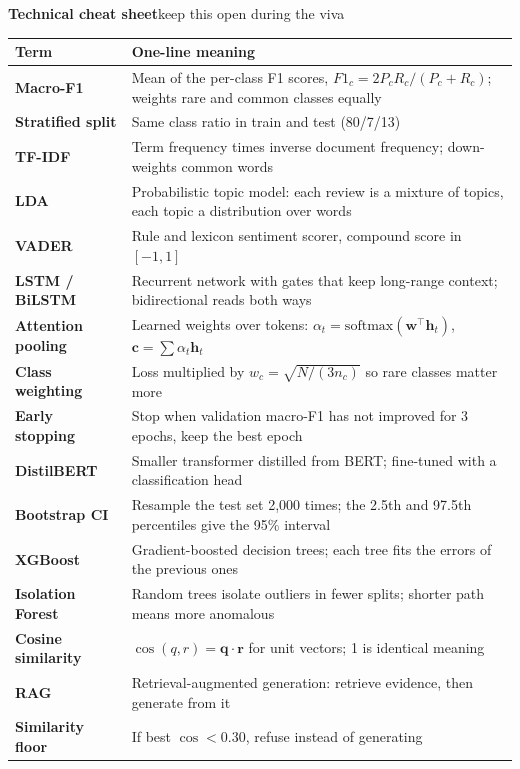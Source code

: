 \documentclass[10pt,a4paper]{article}
\begin{document}
{\color{navy}\bfseries\Large Technical cheat sheet}\hfill{\small keep this open during the viva}
\vspace{3pt}

\begin{tabularx}{\textwidth}{@{}>{\bfseries\RaggedRight}p{3.7cm}>{\RaggedRight}X@{}}
\toprule
Term & One-line meaning \\
\midrule
Macro-F1 & Mean of the per-class F1 scores, $F1_c=2P_cR_c/(P_c+R_c)$; weights rare and common classes equally \\
Stratified split & Same class ratio in train and test (80/7/13) \\
TF-IDF & Term frequency times inverse document frequency; down-weights common words \\
LDA & Probabilistic topic model: each review is a mixture of topics, each topic a distribution over words \\
VADER & Rule and lexicon sentiment scorer, compound score in $[-1,1]$ \\
LSTM / BiLSTM & Recurrent network with gates that keep long-range context; bidirectional reads both ways \\
Attention pooling & Learned weights over tokens: $\alpha_t=\mathrm{softmax}(\mathbf w^\top\mathbf h_t)$, $\mathbf c=\sum\alpha_t\mathbf h_t$ \\
Class weighting & Loss multiplied by $w_c=\sqrt{N/(3n_c)}$ so rare classes matter more \\
Early stopping & Stop when validation macro-F1 has not improved for 3 epochs, keep the best epoch \\
DistilBERT & Smaller transformer distilled from BERT; fine-tuned with a classification head \\
Bootstrap CI & Resample the test set 2,000 times; the 2.5th and 97.5th percentiles give the 95\% interval \\
XGBoost & Gradient-boosted decision trees; each tree fits the errors of the previous ones \\
Isolation Forest & Random trees isolate outliers in fewer splits; shorter path means more anomalous \\
Cosine similarity & $\cos(q,r)=\mathbf q\cdot\mathbf r$ for unit vectors; 1 is identical meaning \\
RAG & Retrieval-augmented generation: retrieve evidence, then generate from it \\
Similarity floor & If best $\cos<0.30$, refuse instead of generating \\
\bottomrule
\end{tabularx}
\end{document}
